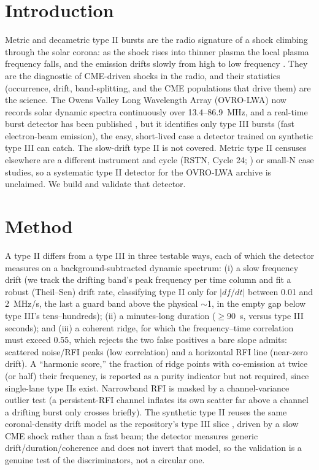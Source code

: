 \documentclass[twocolumn]{aastex631}
\begin{document}

\section{Introduction}
Metric and decametric type II bursts are the radio signature of a shock climbing through the solar
corona: as the shock rises into thinner plasma the local plasma frequency falls, and the emission
drifts slowly from high to low frequency \citep{nelson1985,mann1995}. They are the diagnostic of
CME-driven shocks in the radio, and their statistics (occurrence, drift, band-splitting, and
the CME populations that drive them) are the science. The Owens Valley Long Wavelength Array
(OVRO-LWA) now records solar dynamic spectra continuously over 13.4--86.9~MHz, and a real-time
burst detector has been published \citep{ovrolwa_detector}, but it identifies only type III
bursts (fast electron-beam emission), the easy, short-lived case a detector trained on synthetic
type III can catch. The slow-drift type II is not covered. Metric type II censuses elsewhere are a
different instrument and cycle (RSTN, Cycle 24; \citealt{lawrance2024}) or small-N case studies, so
a systematic type II detector for the OVRO-LWA archive is unclaimed. We build and validate that
detector.

\section{Method}
\label{sec:method}
A type II differs from a type III in three testable ways, each of which
the detector measures on a background-subtracted dynamic spectrum: (i) a slow frequency
drift (we track the drifting band's peak frequency per time column and fit a robust
(Theil--Sen) drift rate, classifying type II only for $|df/dt|$ between 0.01 and 2~MHz/s, the last
a guard band above the physical $\sim$1, in the empty gap below type III's tens--hundreds); (ii) a
minutes-long duration ($\ge$90~s, versus type III seconds); and (iii) a coherent
ridge, for which the frequency--time correlation must exceed 0.55, which rejects the two false positives a
bare slope admits: scattered noise/RFI peaks (low correlation) and a horizontal RFI line
(near-zero drift). A ``harmonic score,'' the fraction of ridge points with co-emission at
twice (or half) their frequency, is reported as a purity indicator but not required, since
single-lane type IIs exist. Narrowband RFI is masked by a channel-variance outlier test (a
persistent-RFI channel inflates its own scatter far above a channel a drifting burst only crosses
briefly). The synthetic type II reuses the same coronal-density drift model as the repository's
type III slice \citep{newkirk1961}, driven by a slow CME shock rather than a fast beam; the
detector measures generic drift/duration/coherence and does not invert that model, so the
validation is a genuine test of the discriminators, not a circular one.
\end{document}
